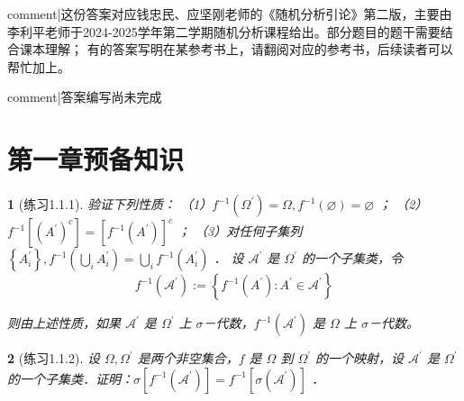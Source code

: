 \newcommand{\B}{\mathfrak{B}}
\newcommand{\RR}{\mathfrak{R}}
\newcommand{\la}{\langle}
\newcommand{\ra}{\rangle}
\newcommand{\norm}[1]{{\left\vert\kern-0.25ex\left\vert\kern-0.25ex\left\vert #1 \right\vert\kern-0.25ex\right\vert\kern-0.25ex\right\vert}}
\theoremstyle{plain} 
\newtheorem*{namedthminner}{} 

\newenvironment{namedthm}[1]
  {\begin{namedthminner}[#1]}
  {\end{namedthminner}}

{{comment|这份答案对应钱忠民、应坚刚老师的《随机分析引论》第二版，主要由
李利平老师于2024-2025学年第二学期随机分析课程给出。部分题目的题干需要结合课本理解；
有的答案写明在某参考书上，请翻阅对应的参考书，后续读者可以帮忙加上。}}

{{comment|答案编写尚未完成}}
\section{第一章\quad  预备知识}
\begin{namedthm}{练习1.1.1}
    验证下列性质：
（1）$f^{-1}\left(\Omega^{\prime}\right)=\Omega, f^{-1}(\varnothing)=\varnothing$ ；
（2）$f^{-1}\left[\left(A^{\prime}\right)^{c}\right]=\left[f^{-1}\left(A^{\prime}\right)\right]^{c}$ ；
（3）对任何子集列 $\left\{A_{i}^{\prime}\right\}, f^{-1}\left(\bigcup_{i} A_{i}^{\prime}\right)=\bigcup_{i} f^{-1}\left(A_{i}^{\prime}\right)$ ．
设 $\mathscr{A}^{\prime}$ 是 $\Omega^{\prime}$ 的一个子集类，令
$$
f^{-1}\left(\mathscr{A}^{\prime}\right):=\left\{f^{-1}\left(A^{\prime}\right): A^{\prime} \in \mathscr{A}^{\prime}\right\}
$$

则由上述性质，如果 $\mathscr{A}^{\prime}$ 是 $\Omega^{\prime}$ 上 $\sigma$－代数，$f^{-1}\left(\mathscr{A}^{\prime}\right)$ 是 $\Omega$ 上 $\sigma$－代数。
\end{namedthm}
\begin{namedthm}{练习1.1.2}
设 $\Omega, \Omega^{\prime}$ 是两个非空集合，$f$ 是 $\Omega$ 到 $\Omega^{\prime}$ 的一个映射，设 $\mathscr{A}^{\prime}$ 是 $\Omega^{\prime}$ 的一个子集类．证明：$\sigma\left[f^{-1}\left(\mathscr{A}^{\prime}\right)\right]=f^{-1}\left[\sigma\left(\mathscr{A}^{\prime}\right)\right]$ ．
\end{namedthm}


